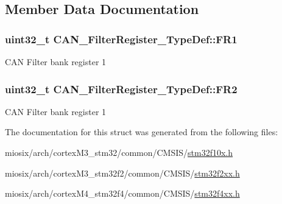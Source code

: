 \subsection{Member Data Documentation}
\hypertarget{struct_c_a_n___filter_register___type_def_ac9bc1e42212239d6830582bf0c696fc5}{
\subsubsection[{F\-R1}]{ uint32\-\_\-t C\-A\-N\-\_\-\-Filter\-Register\-\_\-\-Type\-Def\-::\-F\-R1}}\label{struct_c_a_n___filter_register___type_def_ac9bc1e42212239d6830582bf0c696fc5}
C\-A\-N Filter bank register 1 \hypertarget{struct_c_a_n___filter_register___type_def_a77959e28a302b05829f6a1463be7f800}{
\subsubsection[{F\-R2}]{ uint32\-\_\-t C\-A\-N\-\_\-\-Filter\-Register\-\_\-\-Type\-Def\-::\-F\-R2}}\label{struct_c_a_n___filter_register___type_def_a77959e28a302b05829f6a1463be7f800}
C\-A\-N Filter bank register 1 

The documentation for this struct was generated from the following files\-:\begin{DoxyCompactItemize}
\item 
miosix/arch/cortex\-M3\-\_\-stm32/common/\-C\-M\-S\-I\-S/\hyperlink{stm32f10x_8h}{stm32f10x.\-h}\item 
miosix/arch/cortex\-M3\-\_\-stm32f2/common/\-C\-M\-S\-I\-S/\hyperlink{stm32f2xx_8h}{stm32f2xx.\-h}\item 
miosix/arch/cortex\-M4\-\_\-stm32f4/common/\-C\-M\-S\-I\-S/\hyperlink{stm32f4xx_8h}{stm32f4xx.\-h}\end{DoxyCompactItemize}
